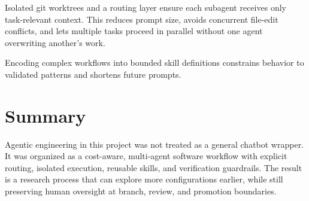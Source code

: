 Isolated git worktrees and a routing layer ensure each subagent receives only task-relevant context. This reduces prompt size, avoids concurrent file-edit conflicts, and lets multiple tasks proceed in parallel without one agent overwriting another's work.

Encoding complex workflows into bounded skill definitions constrains behavior to validated patterns and shortens future prompts.

\section{Summary}\label{agentic-summary}

Agentic engineering in this project was not treated as a general chatbot wrapper. It was organized as a cost-aware, multi-agent software workflow with explicit routing, isolated execution, reusable skills, and verification guardrails. The result is a research process that can explore more configurations earlier, while still preserving human oversight at branch, review, and promotion boundaries.
